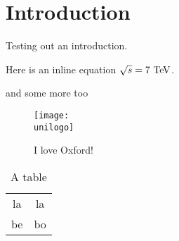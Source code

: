\chapter{Introduction}

Testing out an introduction.

Here is an inline equation $\sqrt{s} = 7\TeV$.

and some more too
\begin{figure}
  \texttt{[image: \\unilogo]}
  \caption{I love Oxford!}
\end{figure}

\begin{table}
  \begin{tabular}{cc}
    la & la \\
    be & bo \\
  \end{tabular}
  \caption{A table}
\end{table}

